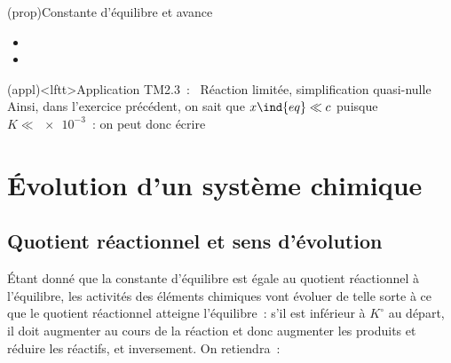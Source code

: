 \documentclass[../../main/main.tex]{subfiles}
\begin{document}
\begin{tcb*}[label=prop:K](prop){Constante d'équilibre et avance\mnt}
	\begin{itemize}
		\item {}%
		\item {}%
	\end{itemize}
	\begin{center}
	\end{center}
\end{tcb*}

\begin{tcn}(appl)<lftt>{Application TM2.3~:~ Réaction limitée, simplification
			quasi-nulle}
	Ainsi, dans l'exercice précédent, on sait que $x\ind{eq} \ll c$ puisque $K \ll
		\num{e-3}$~: on peut donc écrire
	\psw{%
		\[
			K^\circ \approx \frac{x\ind{eq}{}^2}{c c^\circ}
			\Lra
			x\ind{eq} \approx \sqrt{cKc^\circ} = \SI{1.33e-3}{mol.L^{-1}}
		\]
	}
	\vspace{-25pt}
\end{tcn}


\section{Évolution d'un système chimique}
\subsection{Quotient réactionnel et sens d'évolution}

Étant donné que la constante d'équilibre est égale au quotient réactionnel à
l'équilibre, les activités des éléments chimiques vont évoluer de telle sorte à
ce que le quotient réactionnel atteigne l'équilibre~: s'il est inférieur à
$K^\circ$ au départ, il doit augmenter au cours de la réaction et donc
augmenter les produits et réduire les réactifs, et inversement. On retiendra~:
\end{document}

